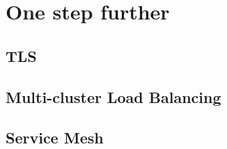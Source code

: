 \chapter{One step further}

\section{TLS}

\section{Multi-cluster Load Balancing}

\section{Service Mesh}
